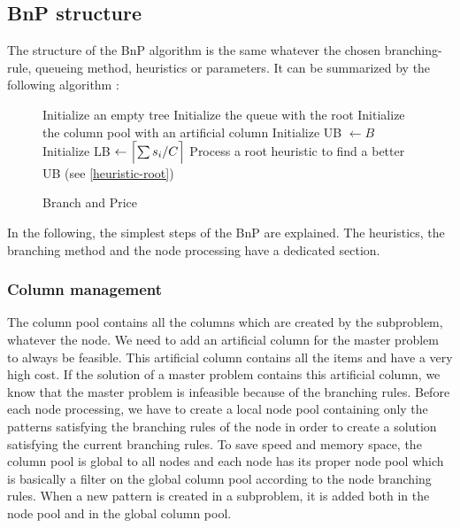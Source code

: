 \subsection{BnP structure}

The structure of the BnP algorithm is the same whatever the chosen branching-rule, queueing method, heuristics or parameters. It can be summarized by the following algorithm :

\begin{figure}[!ht]
	\centering
	\begin{minipage}{0.8\linewidth}
		\begin{algorithm}[H]
			\DontPrintSemicolon 
			\SetAlgoLined
			Initialize an empty tree\;
			Initialize the queue with the root\;
			Initialize the column pool with an artificial column\;
			Initialize UB $\leftarrow B$\;
			Initialize LB $\leftarrow \ceil[\Big]{\sum s_i/C}$\;
			Process a root heuristic to find a better UB (see \ref{heuristic-root})\;
			\caption{Branch and Price}
		\end{algorithm}
	\end{minipage}
\end{figure}
\noindent In the following, the simplest steps of the BnP are explained. The heuristics, the branching method and the node processing have a dedicated section.

\subsubsection{Column management}

The column pool contains all the columns which are created by the subproblem, whatever the node. We need to add an artificial column for the master problem to always be feasible. This artificial column contains all the items and have a very high cost. If the solution of a master problem contains this artificial column, we know that the master problem is infeasible because of the branching rules. Before each node processing, we have to create a local node pool containing only the patterns satisfying the branching rules of the node in order to create a solution satisfying the current branching rules. To save speed and memory space, the column pool is global to all nodes and each node has its proper node pool which is basically a filter on the global column pool according to the node branching rules. When a new pattern is created in a subproblem, it is added both in the node pool and in the global column pool. 

